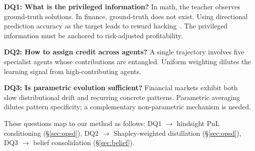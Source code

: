 \textbf{DQ1: What is the privileged information?} In math, the teacher observes ground-truth solutions. In finance, ground-truth does not exist. Using directional prediction accuracy as the target leads to reward hacking~\cite{losingwinner2025}. The privileged information must be anchored to risk-adjusted profitability.

\textbf{DQ2: How to assign credit across agents?} A single trajectory involves five specialist agents whose contributions are entangled. Uniform weighting dilutes the learning signal from high-contributing agents.

\textbf{DQ3: Is parametric evolution sufficient?} Financial markets exhibit both slow distributional drift and recurring concrete patterns. Parametric averaging dilutes pattern specificity; a complementary non-parametric mechanism is needed.

These questions map to our method as follows: DQ1 $\to$ hindsight PnL conditioning (\S\ref{sec:opsd}), DQ2 $\to$ Shapley-weighted distillation (\S\ref{sec:opsd}), DQ3 $\to$ belief consolidation (\S\ref{sec:belief}).
